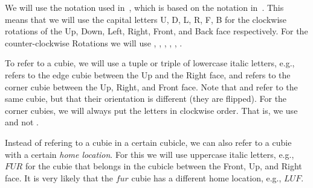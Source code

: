 We will use the notation used in~\cite[Ch. 14]{Hofstadter}, which is based on the notation in~\cite{FreySingmaster}.
This means that we will use the capital letters \rr U, \rr D, \rr L, \rr R, \rr F, \rr B for the clockwise rotations of the Up, Down, Left, Right, Front, and Back face respectively.
For the counter-clockwise Rotations we will use , , , , , .

To refer to a cubie, we will use a tuple or triple of lowercase italic letters, e.g.,  refers to the edge cubie between the Up and the Right face, and  refers to the corner cubie between the Up, Right, and Front face.
Note that  and  refer to the same cubie, but that their orientation is different (they are flipped).
For the corner cubies, we will always put the letters in clockwise order.
That is, we use  and not .

Instead of refering to a cubie in a certain cubicle, we can also refer to a cubie with a certain \emph{home location}.
For this we will use uppercase italic letters, e.g., $FUR$ for the cubie that belongs in the cubicle between the Front, Up, and Right face.
It is very likely that the $fur$ cubie has a different home location, e.g., $LUF$.